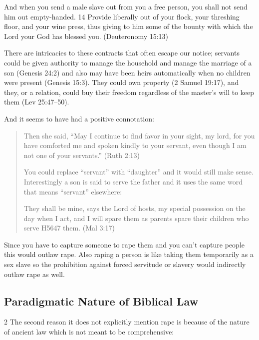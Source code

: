 \documentclass[11pt]{article}
\begin{document}
And when you send a male slave out from you a free person, you shall not send him out empty-handed. 14 Provide liberally out of your flock, your threshing floor, and your wine press, thus giving to him some of the bounty with which the Lord your God has blessed you. (Deuteronomy 15:13)

There are intricacies to these contracts that often escape our notice; servants could be given authority to manage the household and manage the marriage of a son (Genesis 24:2) and also may have been heirs automatically when no children were present (Genesis 15:3). They could own property (2 Samuel 19:17), and they, or a relation, could buy their freedom regardless of the master’s will to keep them (Lev 25:47–50).

And it seems to have had a positive connotation:
\begin{quote}
Then she said, “May I continue to find favor in your sight, my lord, for you have comforted me and spoken kindly to your servant, even though I am not one of your servants.” (Ruth 2:13)

You could replace “servant” with “daughter” and it would still make sense. Interestingly a son is said to serve the father and it uses the same word that means “servant” elsewhere:

They shall be mine, says the Lord of hosts, my special possession on the day when I act, and I will spare them as parents spare their children who serve H5647 them. (Mal 3:17)
\end{quote}
Since you have to capture someone to rape them and you can’t capture people this would outlaw rape. Also raping a person is like taking them temporarily as a sex slave so the prohibition against forced servitude or slavery would indirectly outlaw rape as well.

\subsection{Paradigmatic Nature of Biblical Law}
2 The second reason it does not explicitly mention rape is because of the nature of ancient law which is not meant to be comprehensive:
\end{document}
